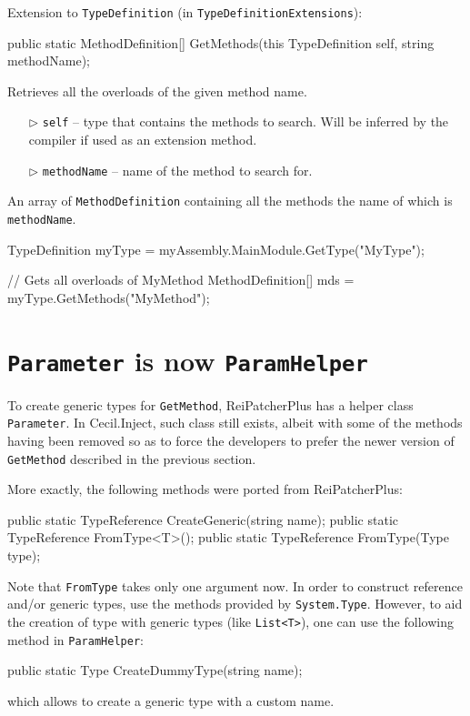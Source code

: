 \documentclass[a4paper,11pt]{article}
\newcommand{\CecilInject}{\textsc{C}{\scriptsize \sc ecil}.\textsc{I}{\scriptsize \sc nject}}
\begin{document}
\begin{mdef}
Extension to \texttt{TypeDefinition} (in \texttt{TypeDefinitionExtensions}):
\begin{cs}
public static MethodDefinition[] GetMethods(this TypeDefinition self, 
                                            string methodName);
\end{cs}

Retrieves all the overloads of the given method name.

\begin{itemize}
\item[$\triangleright$] \texttt{self} -- type that contains the methods to search. Will be inferred by the compiler if used as an extension method.
\item[$\triangleright$] \texttt{methodName} -- name of the method to search for.
\end{itemize}

An array of \texttt{MethodDefinition} containing all the methods the name of which is \texttt{methodName}.

\begin{cs}
TypeDefinition myType = myAssembly.MainModule.GetType("MyType");

// Gets all overloads of MyMethod
MethodDefinition[] mds = myType.GetMethods("MyMethod");
\end{cs}
\end{mdef}

\section{\texttt{Parameter} is now \texttt{ParamHelper}}
To create generic types for \texttt{GetMethod}, ReiPatcherPlus has a helper class \texttt{Parameter}. In \CecilInject{}, such class still exists, albeit with some of the methods having been removed so as to force the developers to prefer the newer version of \texttt{GetMethod} described in the previous section.

More exactly, the following methods were ported from ReiPatcherPlus:
\begin{cs}
public static TypeReference CreateGeneric(string name);
public static TypeReference FromType<T>();
public static TypeReference FromType(Type type);
\end{cs}

Note that \texttt{FromType} takes only one argument now. In order to construct reference and/or generic types, use the methods provided by \texttt{System.Type}. However, to aid the creation of type with generic types (like \texttt{List<T>}), one can use the following method in \texttt{ParamHelper}:
\begin{cs}
public static Type CreateDummyType(string name);
\end{cs}
which allows to create a generic type with a custom name.
\end{document}
